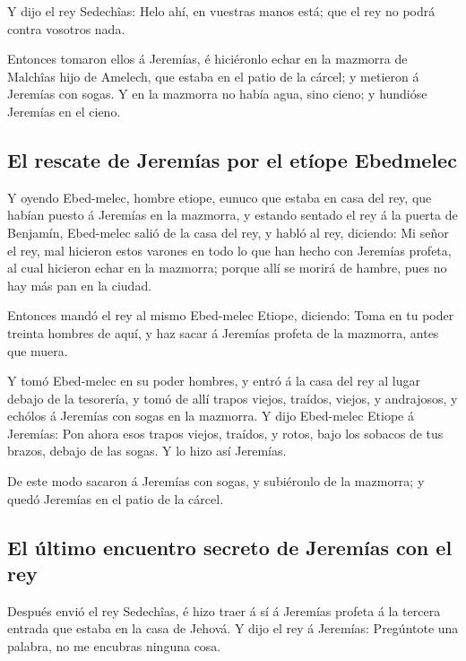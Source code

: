  Y dijo el rey Sedechîas: Helo ahí, en vuestras manos está;
que el rey no podrá contra vosotros nada.

 Entonces tomaron ellos á Jeremías, é hiciéronlo echar en la
mazmorra de Malchîas hijo de Amelech, que estaba en el patio de la
cárcel; y metieron á Jeremías con sogas. Y en la mazmorra no había agua,
sino cieno; y hundióse Jeremías en el cieno.

\hypertarget{el-rescate-de-jeremuxedas-por-el-etuxedope-ebedmelec}{%
\subsection{El rescate de Jeremías por el etíope
Ebedmelec}\label{el-rescate-de-jeremuxedas-por-el-etuxedope-ebedmelec}}

 Y oyendo Ebed-melec, hombre etiope, eunuco que estaba en
casa del rey, que habían puesto á Jeremías en la mazmorra, y estando
sentado el rey á la puerta de Benjamín,  Ebed-melec salió de
la casa del rey, y habló al rey, diciendo:  Mi señor el rey,
mal hicieron estos varones en todo lo que han hecho con Jeremías
profeta, al cual hicieron echar en la mazmorra; porque allí se morirá de
hambre, pues no hay más pan en la ciudad.

 Entonces mandó el rey al mismo Ebed-melec Etiope,
diciendo: Toma en tu poder treinta hombres de aquí, y haz sacar á
Jeremías profeta de la mazmorra, antes que muera.

 Y tomó Ebed-melec en su poder hombres, y entró á la casa
del rey al lugar debajo de la tesorería, y tomó de allí trapos viejos,
traídos, viejos, y andrajosos, y echólos á Jeremías con sogas en la
mazmorra.  Y dijo Ebed-melec Etiope á Jeremías: Pon ahora
esos trapos viejos, traídos, y rotos, bajo los sobacos de tus brazos,
debajo de las sogas. Y lo hizo así Jeremías.

 De este modo sacaron á Jeremías con sogas, y subiéronlo de
la mazmorra; y quedó Jeremías en el patio de la cárcel.

\hypertarget{el-uxfaltimo-encuentro-secreto-de-jeremuxedas-con-el-rey}{%
\subsection{El último encuentro secreto de Jeremías con el
rey}\label{el-uxfaltimo-encuentro-secreto-de-jeremuxedas-con-el-rey}}

 Después envió el rey Sedechîas, é hizo traer á sí á
Jeremías profeta á la tercera entrada que estaba en la casa de Jehová. Y
dijo el rey á Jeremías: Pregúntote una palabra, no me encubras ninguna
cosa.


